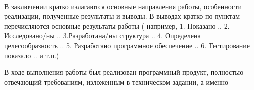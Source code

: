 \Conclusion

\HRule \\
В заключении кратко излагаются основные направления работы, особенности реализации, полученные результаты и выводы. 
В выводах кратко по пунктам перечисляются основные результаты работы (  например, 1. Показано .. 2.  Исследовано/ны .. 3.Разработана/ны структура .. 4. Определена целесообразность .. 5. Разработано программное обеспечение .. 6. Тестирование показало .. и т.п.)

В ходе выполнения работы был реализован программный продукт, полностью отвечающий требованиям, изложенным в техническом задании, а именно 
